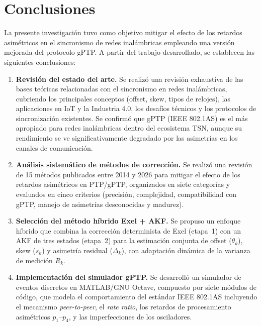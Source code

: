 
\chapter{Conclusiones}
\label{ch:conclusiones}

La presente investigación tuvo como objetivo mitigar el efecto de los retardos asimétricos en el sincronismo de redes inalámbricas empleando una versión mejorada del protocolo gPTP. A partir del trabajo desarrollado, se establecen las siguientes conclusiones:

\begin{enumerate}
\item \textbf{Revisión del estado del arte.} Se realizó una revisión exhaustiva de las bases teóricas relacionadas con el sincronismo en redes inalámbricas, cubriendo los principales conceptos (offset, skew, tipos de relojes), las aplicaciones en IoT y la Industria 4.0, los desafíos técnicos y los protocolos de sincronización existentes. Se confirmó que gPTP (IEEE 802.1AS) es el más apropiado para redes inalámbricas dentro del ecosistema TSN, aunque su rendimiento se ve significativamente degradado por las asimetrías en los canales de comunicación.

\item \textbf{Análisis sistemático de métodos de corrección.} Se realizó una revisión de 15 métodos publicados entre 2014 y 2026 para mitigar el efecto de los retardos asimétricos en PTP/gPTP, organizados en siete categorías y evaluados en cinco criterios (precisión, complejidad, compatibilidad con gPTP, manejo de asimetrías desconocidas y madurez).

\item \textbf{Selección del método híbrido Exel + AKF.} Se propuso un enfoque híbrido que combina la corrección determinista de Exel (etapa~1) con un AKF de tres estados (etapa~2) para la estimación conjunta de offset ($\theta_k$), skew ($s_k$) y asimetría residual ($\Delta_k$), con adaptación dinámica de la varianza de medición $R_k$.

\item \textbf{Implementación del simulador gPTP.} Se desarrolló un simulador de eventos discretos en MATLAB/GNU Octave, compuesto por siete módulos de código, que modela el comportamiento del estándar IEEE 802.1AS incluyendo el mecanismo \textit{peer-to-peer}, el \textit{rate ratio}, los retardos de procesamiento asimétricos $p_1$--$p_4$, y las imperfecciones de los osciladores.


\end{enumerate}
